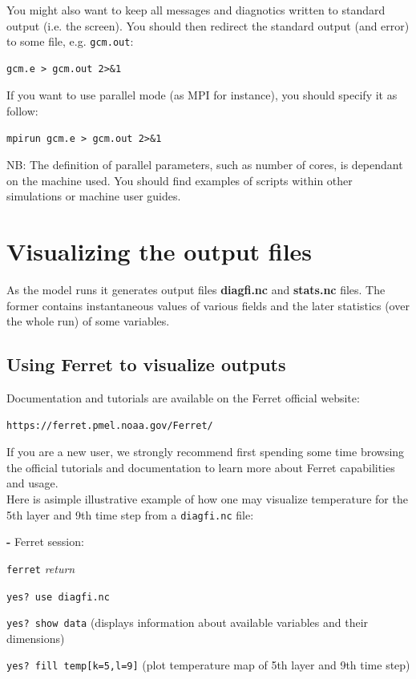 You might also want to keep all messages and diagnotics written to standard
output (i.e. the screen). You should then redirect the standard output
(and error) to some file, e.g. {\tt gcm.out}:
\begin{verbatim}
gcm.e > gcm.out 2>&1
\end{verbatim}

If you want to use parallel mode (as MPI for instance), you should specify it as follow:
\begin{verbatim}
mpirun gcm.e > gcm.out 2>&1
\end{verbatim}
NB: The definition of parallel parameters, such as number of cores, is dependant on the machine used.
You should find examples of scripts within other simulations or machine user guides.


\section{Visualizing the output files}

As the model runs it generates output files {\bf diagfi.nc} and
{\bf stats.nc} files. The former contains instantaneous values of
various fields and the later statistics (over the whole run) of some
variables.

\subsection{Using Ferret to visualize outputs}
Documentation and tutorials are available on the Ferret official website:
\begin{verbatim}
https://ferret.pmel.noaa.gov/Ferret/
\end{verbatim}
If you are a new user, we strongly recommend first spending some time browsing the official tutorials and documentation to learn more about Ferret capabilities and usage.\\

Here is asimple illustrative example of how one may visualize temperature for the 5th layer and 9th time step from a {\tt diagfi.nc} file:
\begin{description}
\item {\bf -} Ferret session:
  \begin{description}
  \item \verb+ferret+ {\it return}
  \item \verb!yes? use diagfi.nc!
  \item \verb!yes? show data! (displays information about available variables and their dimensions)
  \item \verb!yes? fill temp[k=5,l=9]! (plot temperature map of 5th layer and 9th time step) 
  \end{description}
\end{description}

